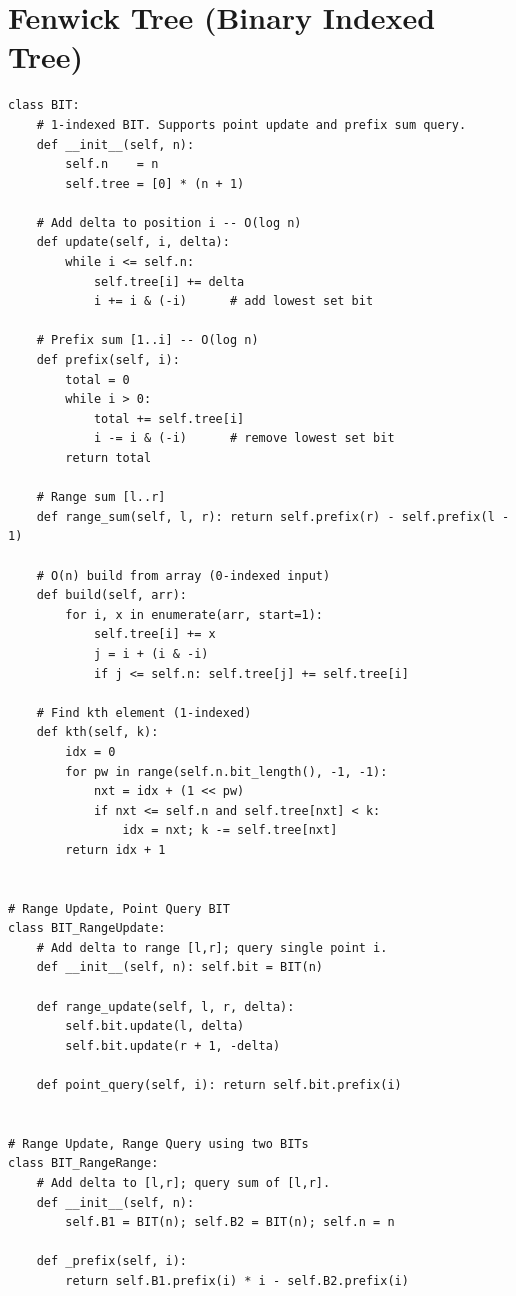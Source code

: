 \documentclass[11pt,a4paper]{report}
\begin{document}
\chapter{Fenwick Tree (Binary Indexed Tree)}

\begin{lstlisting}
class BIT:
    # 1-indexed BIT. Supports point update and prefix sum query.
    def __init__(self, n):
        self.n    = n
        self.tree = [0] * (n + 1)

    # Add delta to position i -- O(log n)
    def update(self, i, delta):
        while i <= self.n:
            self.tree[i] += delta
            i += i & (-i)      # add lowest set bit

    # Prefix sum [1..i] -- O(log n)
    def prefix(self, i):
        total = 0
        while i > 0:
            total += self.tree[i]
            i -= i & (-i)      # remove lowest set bit
        return total

    # Range sum [l..r]
    def range_sum(self, l, r): return self.prefix(r) - self.prefix(l - 1)

    # O(n) build from array (0-indexed input)
    def build(self, arr):
        for i, x in enumerate(arr, start=1):
            self.tree[i] += x
            j = i + (i & -i)
            if j <= self.n: self.tree[j] += self.tree[i]

    # Find kth element (1-indexed)
    def kth(self, k):
        idx = 0
        for pw in range(self.n.bit_length(), -1, -1):
            nxt = idx + (1 << pw)
            if nxt <= self.n and self.tree[nxt] < k:
                idx = nxt; k -= self.tree[nxt]
        return idx + 1


# Range Update, Point Query BIT
class BIT_RangeUpdate:
    # Add delta to range [l,r]; query single point i.
    def __init__(self, n): self.bit = BIT(n)

    def range_update(self, l, r, delta):
        self.bit.update(l, delta)
        self.bit.update(r + 1, -delta)

    def point_query(self, i): return self.bit.prefix(i)


# Range Update, Range Query using two BITs
class BIT_RangeRange:
    # Add delta to [l,r]; query sum of [l,r].
    def __init__(self, n):
        self.B1 = BIT(n); self.B2 = BIT(n); self.n = n

    def _prefix(self, i):
        return self.B1.prefix(i) * i - self.B2.prefix(i)


\end{lstlisting}
\end{document}
